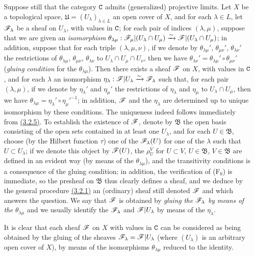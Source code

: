 \begin{env}[3.3.1]
\label{0.3.3.1}
Suppose still that the category $\mathtt{C}$ admits (generalized) projective limits. Let
$X$ be a topological space, $\mathfrak{U}=(U_\lambda)_{\lambda\in L}$ an open
cover of $X$, and for each $\lambda\in L$, let $\mathscr{F}_\lambda$ be a sheaf on
$U_\lambda$, with values in $\mathtt{C}$; for each pair of indices $(\lambda,\mu)$,
suppose that we are given an {\em isomorphism}
$\theta_{\lambda\mu}:\mathscr{F}_\mu|(U_\lambda\cap U_\mu)
  \xrightarrow{\sim}\mathscr{F}|(U_\lambda\cap U_\mu)$; in addition, suppose that for each triple
$(\lambda,\mu,\nu)$, if we denote by $\theta_{\lambda\mu}'$, $\theta_{\mu\nu}'$,
$\theta_{\lambda\nu}'$ the restrictions of $\theta_{\lambda\mu}$,
$\theta_{\mu\nu}$, $\theta_{\lambda\nu}$ to $U_\lambda\cap U_\mu\cap U_\nu$,
then we have $\theta_{\lambda\nu}'=\theta_{\lambda\mu}'\circ\theta_{\mu\nu}'$
({\em gluing condition} for the $\theta_{\lambda\mu}$). Then there exists a
sheaf $\mathscr{F}$ on $X$, with values in $\mathtt{C}$, and for each $\lambda$ an
isomorphism $\eta_\lambda:\mathscr{F}|U_\lambda\xrightarrow{\sim}\mathscr{F}_\lambda$ such that, for
each pair $(\lambda,\mu)$, if we denote by $\eta_\lambda'$ and $\eta_\mu'$ the
restrictions of $\eta_\lambda$ and $\eta_\mu$ to $U_\lambda\cap U_\mu$, then we
have $\theta_{\lambda\mu}=\eta_\lambda'\circ{\eta_\mu'}^{-1}$; in addition,
$\mathscr{F}$ and the $\eta_\lambda$ are determined up to unique isomorphism by these
conditions. The uniqueness indeed follows immediately from \hyperref[0.3.2.5]{(3.2.5)}. To
establish the existence of $\mathscr{F}$, denote by $\mathfrak{B}$ the open basis
consisting of the open sets contained in at least one $U_\lambda$, and for each
$U\in\mathfrak{B}$, choose (by the Hilbert function $\tau$) one of the
$\mathscr{F}_\lambda(U)$ for one of the $\lambda$ such that $U\subset U_\lambda$; if
we denote this object by $\mathscr{F}(U)$, the $\rho_U^V$ for $U\subset V$,
$U\in\mathfrak{B}$, $V\in\mathfrak{B}$ are defined in an evident way (by means
of the $\theta_{\lambda\mu}$), and the transitivity conditions is a consequence
of the gluing condition; in addition, the verification of (F$_0$) is immediate,
so the presheaf on $\mathfrak{B}$ thus clearly defines a sheaf, and we deduce by
the general procedure \hyperref[0.3.2.1]{(3.2.1)} an (ordinary) sheaf still denoted
$\mathscr{F}$ and which answers the question. We say that $\mathscr{F}$ is obtained by
{\em gluing the $\mathscr{F}_\lambda$ by means of the $\theta_{\lambda\mu}$} and we
usually identify the $\mathscr{F}_\lambda$ and $\mathscr{F}|U_\lambda$ by means of the
$\eta_\lambda$.

It is clear that each sheaf $\mathscr{F}$ on $X$ with values in $\mathtt{C}$ can be
considered as being obtained by the gluing of the sheaves
$\mathscr{F}_\lambda=\mathscr{F}|U_\lambda$ (where $(U_\lambda)$ is an arbitrary open
cover of $X$), by means of the isomorphisms $\theta_{\lambda\mu}$ reduced to the
identity.
\end{env}

